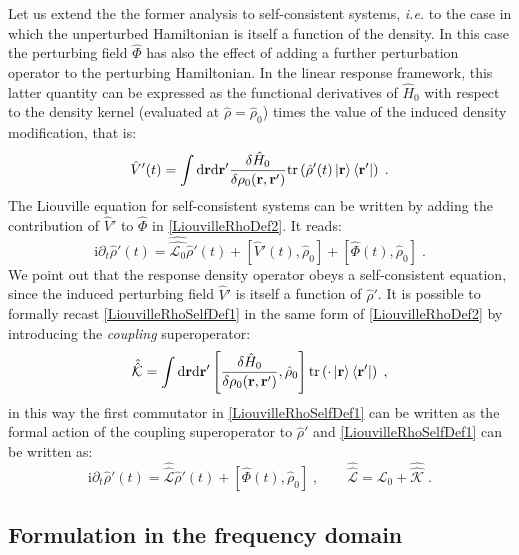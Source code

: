 \documentclass[a4paper]{article}
\renewcommand{\d}{\partial}
\newcommand{\dd}{{\rm d}}
\renewcommand{\r}{{\bf r}}
\newcommand{\ii}{\mathrm{i}}
\newcommand{\be}{\begin{equation}}
\newcommand{\ee}{\end{equation}}
\newcommand{\qq}{\qquad}
\newcommand{\lb}{\label}
\newcommand{\op}[1]{\hat {#1}}
\newcommand{\sop}[1]{\op{\op {#1}}}
\newcommand{\commutator}[2]{\left[ {#1} , {#2} \right]}
\newcommand{\trace}[1]{\mathrm{tr}\left(#1\right)}
\newcommand{\dmnot}{\op{\rho}_0}
\newcommand{\dm}{\op{\rho}}
\newcommand{\hnot}{\op{H}_0}
\newcommand{\Liouv}{\sop{\mathcal L}}
\newcommand{\Liouvnot}{\sop{\mathcal L_0}}
\newcommand{\coupl}{\sop{\mathcal K}}
\begin{document}
Let us extend the the former analysis to self-consistent systems, \emph{i.e.} to the case in which the unperturbed Hamiltonian is itself a function of the density.
In this case the perturbing field $\op\Phi$ has also the effect of adding a further perturbation operator to the perturbing Hamiltonian. In the linear response framework, 
this latter quantity can be expressed as the functional derivatives of $\hnot$ with respect to the density kernel (evaluated at $\dm=\dmnot$) times the value of the
induced density modification, that is:
\be\label{Vptspacedef1}
\op V'(t)= 
\int \dd \r \dd \r' \frac{\delta\hnot}{\delta \rho_0(\r,\r')}
\trace{\dm'(t) \ket{\r} \bra{\r'}} \;.
\ee
The Liouville equation for self-consistent systems can be written by adding the contribution of $\op V'$ to $\op\Phi$ in \eqref{LiouvilleRhoDef2}. 
It reads:
\be\lb{LiouvilleRhoSelfDef1}
\ii \d_t \dm'(t) = \Liouvnot \dm'(t) + \commutator{\op V'(t)}{\dmnot} + \commutator{\op \Phi(t)}{\dmnot} \;.
\ee
We point out that the response density operator obeys a self-consistent equation, since the  induced perturbing field $\op V'$ is itself a function of $\dm'$. 
It is possible to formally recast \eqref{LiouvilleRhoSelfDef1} in the same form of \eqref{LiouvilleRhoDef2} by introducing the \emph{coupling}
superoperator:
\be\lb{couplingSopDef1}
\coupl = 
\int \dd \r \dd \r' \commutator{\frac{\delta\hnot}{\delta \rho_0(\r,\r')}}{\dmnot}
\trace{\cdot \ket{\r} \bra{\r'}} \;,
\ee
in this way the first commutator in \eqref{LiouvilleRhoSelfDef1} can be written as the formal action of the coupling superoperator to $\dm'$ and \eqref{LiouvilleRhoSelfDef1}
can be written as:
\be\lb{LiouvilleRhoSelfDef2}
\ii \d_t \dm'(t) = \Liouv \dm'(t) + \commutator{\op \Phi(t)}{\dmnot} \;, \qq
\Liouv = \Liouvnot + \coupl \;.
\ee

\subsection{Formulation in the frequency domain}
\end{document}
